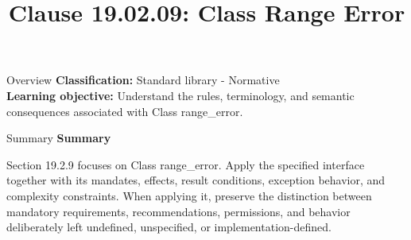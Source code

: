 \documentclass[10pt,letterpaper]{article}
\title{Clause 19.02.09: Class Range Error}
\author{}
\date{}
\begin{document}
\maketitle
\begin{CornellOverviewBox}{Overview}
\textbf{Classification:} Standard library - Normative\\[2pt]
\textbf{Learning objective:} Understand the rules, terminology, and semantic consequences associated with Class range\_error.
\end{CornellOverviewBox}\begin{CornellSummaryBox}{Summary}
{\sffamily\bfseries\color{Accent} Summary}\par\vspace{3pt}Section 19.2.9 focuses on Class range\_error. Apply the specified interface together with its mandates, effects, result conditions, exception behavior, and complexity constraints. When applying it, preserve the distinction between mandatory requirements, recommendations, permissions, and behavior deliberately left undefined, unspecified, or implementation-defined.
\end{CornellSummaryBox}
\end{document}
